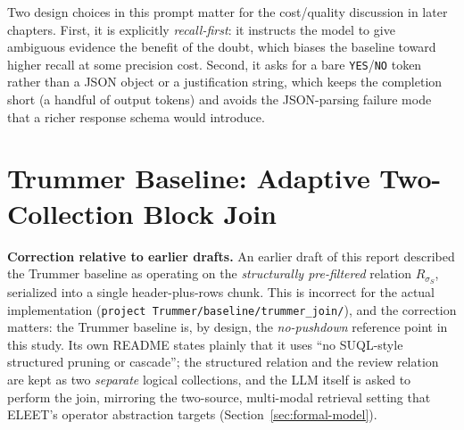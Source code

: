 Two design choices in this prompt matter for the cost/quality
discussion in later chapters. First, it is explicitly
\emph{recall-first}: it instructs the model to give ambiguous evidence
the benefit of the doubt, which biases the baseline toward higher recall
at some precision cost. Second, it asks for a bare \texttt{YES}/\texttt{NO}
token rather than a JSON object or a justification string, which keeps
the completion short (a handful of output tokens) and avoids the
JSON-parsing failure mode that a richer response schema would introduce.

\section{Trummer Baseline: Adaptive Two-Collection Block Join}
\label{sec:trummer-baseline}

\textbf{Correction relative to earlier drafts.} An earlier draft of this
report described the Trummer baseline as operating on the
\emph{structurally pre-filtered} relation $R_{\sigma_S}$, serialized into
a single header-plus-rows chunk. This is incorrect for the actual
implementation (\texttt{project Trummer/baseline/trummer\_join/}), and
the correction matters: the Trummer baseline is, by design, the
\emph{no-pushdown} reference point in this study. Its own README states
plainly that it uses ``no SUQL-style structured pruning or cascade''; the
structured relation and the review relation are kept as two
\emph{separate} logical collections, and the LLM itself is asked to
perform the join, mirroring the two-source, multi-modal retrieval
setting that ELEET's operator abstraction targets
(Section~\ref{sec:formal-model}).

